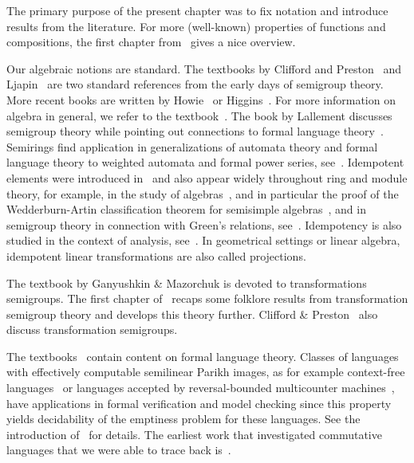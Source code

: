 
The primary purpose of the present chapter was to fix notation and introduce results from the literature. 
For more (well-known) properties of functions and compositions, the first chapter from~\cite{Pin2022}
gives a nice overview.

Our algebraic notions are standard.
The textbooks by Clifford and Preston~\cite{clifford61,clifford1967algebraic} and Ljapin~\cite{ljapin1974semigroups}
are two standard references from the early days of semigroup theory.
More recent books are written by Howie~\cite{howie1995fundamentals} or Higgins~\cite{higgins1992techniques}.
For more information on algebra in general, we refer to the textbook~\cite{lang02}.
The book by Lallement discusses semigroup theory while pointing
out connections to formal language theory~\cite{Lallement79}.
Semirings find application in generalizations of automata theory and formal language theory
to weighted automata and formal power series, see~\cite{KuichSalomaa1986_SemiringsAutomataLanguages,berstel1988rational}.
Idempotent elements were introduced in~\cite{peirce1882linear} and 
also appear widely throughout ring and module theory, for example, in the study of algebras~\cite{peirce1882linear,Lam2001,AnhBirkenmeierVanWyk2020},
and in particular the proof of the Wedderburn-Artin classification theorem for semisimple 
algebras~\cite{Artin1928Hyperkomplex,Lam2001,Wedderburn1908Hypercomplex},
and in semigroup theory in connection with Green's relations, see~\cite{clifford61,clifford1967algebraic,howie1995fundamentals}.
Idempotency is also studied in the context of analysis, see~\cite{KolokoltsovMaslov1997IdempotentAnalysis}. 
In geometrical settings or linear algebra, idempotent linear transformations are also 
called projections.

The textbook by Ganyushkin \& Mazorchuk \cite{GanyushkinMazorchuk2008} is devoted to transformations semigroups.
The first chapter of~\cite{Eilenberg1976} recaps some folklore results from transformation semigroup theory
and develops this theory further. Clifford \& Preston~\cite{clifford61,clifford1967algebraic}
also discuss transformation semigroups. 

The textbooks~\cite{Eilenberg1974,HopUll79,DBLP:books/daglib/0088160,lothaire_1997,Pin2022,sipser2012theory} contain
content on formal language theory. Classes of languages with effectively computable semilinear Parikh images,
as for example context-free languages~\cite{chomsky1962context,DBLP:journals/jacm/Parikh66}
or languages accepted by reversal-bounded multicounter machines~\cite{DBLP:journals/jacm/Ibarra78},
have applications in formal verification and model checking
since this property yields decidability of the emptiness problem
for these languages. See the introduction of~\cite{Hoffmann2024b}
for details. The earliest work that investigated commutative languages
that we were able to trace back is~\cite{laingwright62}.

